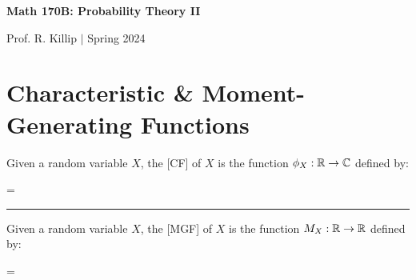 \documentclass[12pt]{extarticle}
\begin{document}
	

\begin{center}
    \begin{Large}
        \textbf{Math 170B: Probability Theory II}
    \end{Large}
    
    \begin{large}
        \vspace{8pt}
        Prof. R. Killip $\vert$ Spring 2024
    \end{large}
\end{center}
\tableofcontents

\pagebreak
\section{Characteristic \& Moment-Generating Functions}
\begin{tcolorbox}[colback=white]
    \begin{definition}
        Given a random variable $X$, the  [CF] of $X$ is the function $\phi_X:\mathbb{R}\to\mathbb{C}$ defined by: 
        \begin{eqnbox}
            =
        \end{eqnbox}
    \end{definition}
    
    \begin{center}
        \vspace{3pt}
        \rule{14cm}{0.4pt}
    \end{center}
    
    \begin{definition}
        Given a random variable $X$, the  [MGF] of $X$ is the function $M_X:\mathbb{R}\to\mathbb{R}$ defined by: 
        \begin{eqnbox}
            =
        \end{eqnbox}
    \end{definition}
\end{tcolorbox}
\end{document}
